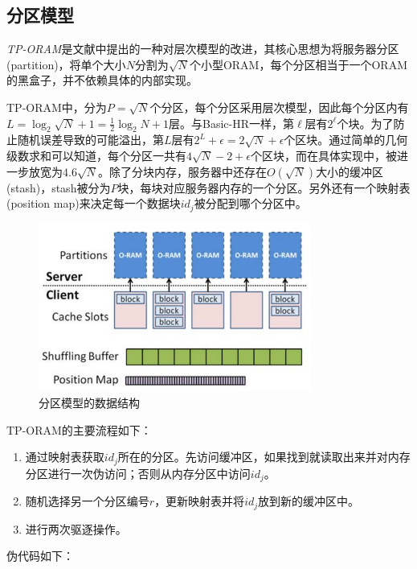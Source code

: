\subsection{分区模型}
\textit{TP-ORAM}是文献\cite{ref7}中提出的一种对层次模型的改进，其核心思想为将服务器分区(partition)，将单个大小$N$分割为$\sqrt N$个小型ORAM，每个分区相当于一个ORAM的黑盒子，并不依赖具体的内部实现。\par
TP-ORAM中，分为$P=\sqrt{N}$个分区，每个分区采用层次模型，因此每个分区内有$L=\log_2{\sqrt{N}}+1=\frac{1}{2}\log_2N+1$层。与Basic-HR一样，第$\ell$层有$2^\ell$个块。为了防止随机误差导致的可能溢出，第$L$层有$2^L+\epsilon=2\sqrt{N}+\epsilon$个区块。通过简单的几何级数求和可以知道，每个分区一共有$4\sqrt{N}-2+\epsilon$个区块，而在具体实现\cite{ref7}中，被进一步放宽为$4.6\sqrt{N}$。除了分块内存，服务器中还存在$O(\sqrt{N})$大小的缓冲区(stash)，stash被分为$P$块，每块对应服务器内存的一个分区。另外还有一个映射表(position map)来决定每一个数据块$id_j$被分配到哪个分区中。
\begin{figure}[H]
    \centering
    \includegraphics[width=0.8\textwidth]{orams/partition.pdf}
    \caption{分区模型的数据结构}
    \label{fig:part}
\end{figure}
\noindent TP-ORAM的主要流程如下：
\begin{enumerate}
    \item 通过映射表获取$id_j$所在的分区。先访问缓冲区，如果找到就读取出来并对内存分区进行一次伪访问；否则从内存分区中访问$id_j$。
    \item 随机选择另一个分区编号$r$，更新映射表并将$id_j$放到新的缓冲区中。
    \item 进行两次驱逐操作。
\end{enumerate}
伪代码如下：
